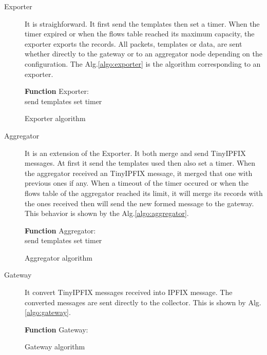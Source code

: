 \begin{description}
  \item[Exporter] It is straighforward. It first send the templates then set a timer. When the timer expired or when the flows table reached its maximum capacity, the exporter exports the records. All packets, templates or data, are sent whether directly to the gateway or to an aggregator node depending on the configuration. The Alg.\ref{algo:exporter} is the algorithm corresponding to an exporter.

  \begin{algorithm}
    \textbf{Function} Exporter:\\
    send templates\;
    set timer\;
   \caption{Exporter algorithm}
   \label{algo:exporter}
  \end{algorithm}

  \item[Aggregator] It is an extension of the Exporter. It both merge and send TinyIPFIX messages. At first it send the templates used then also set a timer. When the aggregator received an TinyIPFIX message, it merged that one with previous ones if any. When a timeout of the timer occured or when the flows table of the aggregator reached its limit, it will merge its records with the ones received then will send the new formed message to the gateway. This behavior is shown by the Alg.\ref{algo:aggregator}.

  \begin{algorithm}
    \textbf{Function} Aggregator:\\
    send templates\;
    set timer\;
   \caption{Aggregator algorithm}
   \label{algo:aggregator}
  \end{algorithm}

  \item[Gateway] It convert TinyIPFIX messages received into IPFIX message. The converted messages are sent directly to the collector. This is shown by Alg.\ref{algo:gateway}.

  \begin{algorithm}
    \textbf{Function} Gateway:\\
   \caption{Gateway algorithm}
   \label{algo:gateway}
  \end{algorithm}

\end{description}

